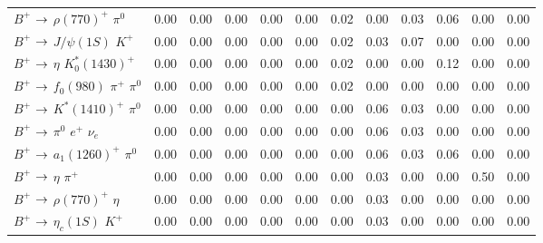 {\begin{tabular}{lrrrrrrrrrrr}
$B^{+}$ $\rightarrow$ $\rho(770)^{+}$ $\pi^{0}$                              &         0.00 &         0.00 &         0.00 &         0.00 &         0.00 &         0.02 &         0.00 &         0.03 &         0.06 &         0.00 &         0.00 \\
$B^{+}$ $\rightarrow$ $J/\psi(1S)$ $K^{+}$                                   &         0.00 &         0.00 &         0.00 &         0.00 &         0.00 &         0.02 &         0.03 &         0.07 &         0.00 &         0.00 &         0.00 \\
$B^{+}$ $\rightarrow$ $\eta$ $K_{0}^{*}(1430)^{+}$                           &         0.00 &         0.00 &         0.00 &         0.00 &         0.00 &         0.02 &         0.00 &         0.00 &         0.12 &         0.00 &         0.00 \\
$B^{+}$ $\rightarrow$ $f_{0}(980)$ $\pi^{+}$ $\pi^{0}$                       &         0.00 &         0.00 &         0.00 &         0.00 &         0.00 &         0.02 &         0.00 &         0.00 &         0.00 &         0.00 &         0.00 \\
$B^{+}$ $\rightarrow$ $K^{*}(1410)^{+}$ $\pi^{0}$                            &         0.00 &         0.00 &         0.00 &         0.00 &         0.00 &         0.00 &         0.06 &         0.03 &         0.00 &         0.00 &         0.00 \\
$B^{+}$ $\rightarrow$ $\pi^{0}$ $e^{+}$ $\nu_{e}$                            &         0.00 &         0.00 &         0.00 &         0.00 &         0.00 &         0.00 &         0.06 &         0.03 &         0.00 &         0.00 &         0.00 \\
$B^{+}$ $\rightarrow$ $a_{1}(1260)^{+}$ $\pi^{0}$                            &         0.00 &         0.00 &         0.00 &         0.00 &         0.00 &         0.00 &         0.06 &         0.03 &         0.06 &         0.00 &         0.00 \\
$B^{+}$ $\rightarrow$ $\eta$ $\pi^{+}$                                       &         0.00 &         0.00 &         0.00 &         0.00 &         0.00 &         0.00 &         0.03 &         0.00 &         0.00 &         0.50 &         0.00 \\
$B^{+}$ $\rightarrow$ $\rho(770)^{+}$ $\eta$                                 &         0.00 &         0.00 &         0.00 &         0.00 &         0.00 &         0.00 &         0.03 &         0.00 &         0.00 &         0.00 &         0.00 \\
$B^{+}$ $\rightarrow$ $\eta_{c}(1S)$ $K^{+}$                                 &         0.00 &         0.00 &         0.00 &         0.00 &         0.00 &         0.00 &         0.03 &         0.00 &         0.00 &         0.00 &         0.00 \\

\end{tabular}}
